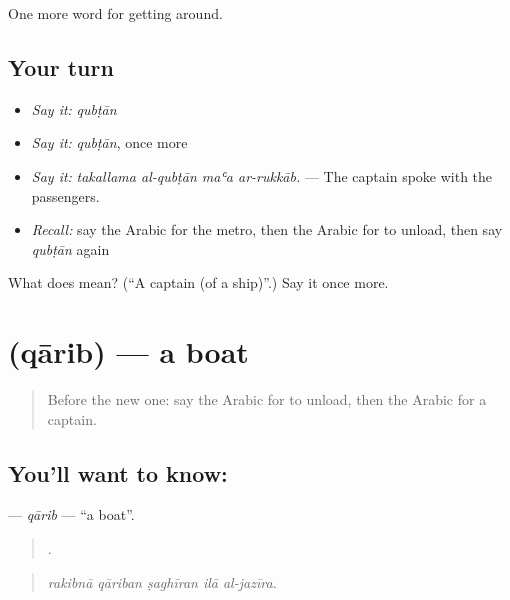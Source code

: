 \begin{grammarlens}[title={What you've built}]
One more word for getting around.
\end{grammarlens}

\subsection*{Your turn}
\begin{itemize}
\raggedright
  \item \emph{Say it:} \emph{qubṭān}
  \item \emph{Say it:} \emph{qubṭān}, once more
  \item \emph{Say it:} \emph{takallama al-qubṭān maʿa ar-rukkāb.} — The captain spoke with the passengers.
  \item \emph{Recall:} say the Arabic for the metro, then the Arabic for to unload, then say \emph{qubṭān} again
\end{itemize}

\begin{tcolorbox}[breakable,colback=teal!4,colframe=teal!35!black,title={Before you move on}]
What does  mean? (\textquotedblleft{}A captain (of a ship)\textquotedblright{}.) Say it once more.
\end{tcolorbox}
\section[\texorpdfstring{\ar{قارب} (qārib)}{قارب (qārib)}]{ (qārib) — a boat}

\label{lesson:AR-C429-qarib}



\begin{quote}
Before the new one: say the Arabic for to unload, then the Arabic for a captain.
\end{quote}

\subsection*{You'll want to know: }
\textbf{} — \emph{qārib} — \textquotedblleft{}a boat\textquotedblright{}.

\begin{quote}
    .
\end{quote}

\begin{quote}
\emph{rakibnā qāriban ṣaghīran ilā al-jazīra.}
\end{quote}

